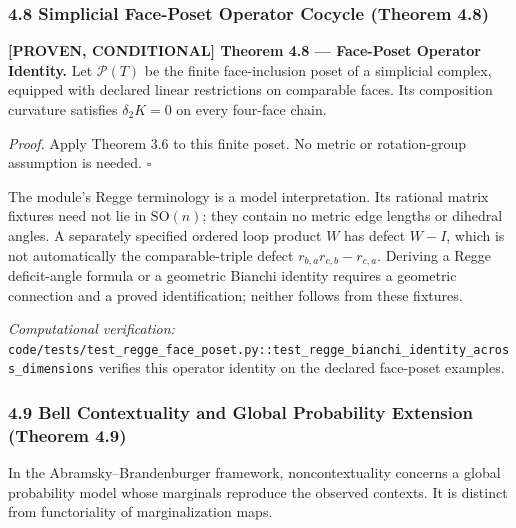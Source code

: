 \documentclass[
  english,
  10pt,
  a4paper,
]{article}
\renewenvironment{quote}
  {\begin{leftbar}\small}
  {\end{leftbar}}
\begin{document}
\subsubsection{4.8 Simplicial Face-Poset Operator Cocycle (Theorem
4.8)}\label{simplicial-face-poset-operator-cocycle-theorem-4.8}

\begin{quote}
\textbf{{[}PROVEN, CONDITIONAL{]} Theorem 4.8 --- Face-Poset Operator
Identity.} Let \(\mathcal P(T)\) be the finite face-inclusion poset of a
simplicial complex, equipped with declared linear restrictions on
comparable faces. Its composition curvature satisfies \(\delta_2K=0\) on
every four-face chain.

\emph{Proof.} Apply Theorem 3.6 to this finite poset. No metric or
rotation-group assumption is needed. \(\square\)
\end{quote}

The module's Regge terminology is a model interpretation. Its rational
matrix fixtures need not lie in \(\mathrm{SO}(n)\); they contain no
metric edge lengths or dihedral angles. A separately specified ordered
loop product \(W\) has defect \(W-I\), which is not automatically the
comparable-triple defect \(r_{b,a}r_{c,b}-r_{c,a}\). Deriving a Regge
deficit-angle formula or a geometric Bianchi identity requires a
geometric connection and a proved identification; neither follows from
these fixtures.

\emph{Computational verification:}
\nolinkurl{code/tests/test_regge_face_poset.py::test_regge_bianchi_identity_across_dimensions}
verifies this operator identity on the declared face-poset examples.

\subsubsection{4.9 Bell Contextuality and Global Probability Extension
(Theorem
4.9)}\label{bell-contextuality-and-global-probability-extension-theorem-4.9}

In the Abramsky--Brandenburger framework, noncontextuality concerns a
global probability model whose marginals reproduce the observed
contexts. It is distinct from functoriality of marginalization maps.
\end{document}
